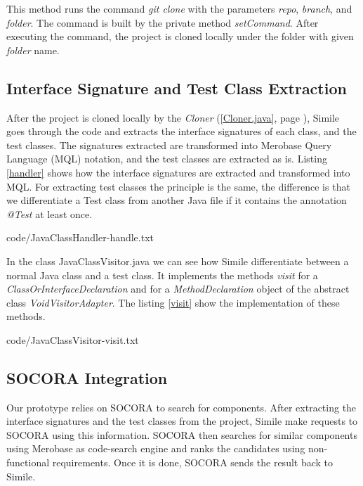 This method runs the command \emph{git clone} with the parameters \emph{repo}, \emph{branch}, and \emph{folder}. The command is built by the private method \emph{setCommand}. After executing the command, the project is cloned locally under the folder with given \emph{folder} name.

\subsection{Interface Signature and Test Class Extraction}
\label{simile:code-analysis}
After the project is cloned locally by the \emph{Cloner} (\ref{Cloner.java}, page \pageref{Cloner.java}), Simile goes through the code and extracts the interface signatures of each class, and the test classes. The signatures extracted are transformed into Merobase Query Language (MQL) notation, and the test classes are extracted as is. Listing \ref{handler} shows how the interface signatures are extracted and transformed into MQL. For extracting test classes the principle is the same, the difference is that we differentiate a Test class from another Java file if it contains the annotation \emph{@Test} at least once.


{code/JavaClassHandler-handle.txt}

In the class JavaClassVisitor.java we can see how Simile differentiate between a normal Java class and a test class. It implements the methods \emph{visit} for a \emph{ClassOrInterfaceDeclaration} and for a \emph{MethodDeclaration} object of the abstract class \emph{VoidVisitorAdapter}. The listing \ref{visit} show the implementation of these methods.


{code/JavaClassVisitor-visit.txt}

\subsection{SOCORA Integration}
\label{socora-integration}
Our prototype relies on SOCORA to search for components. After extracting the interface signatures and the test classes from the project, Simile make requests to SOCORA using this information. SOCORA then searches for similar components using Merobase as code-search engine and ranks the candidates using non-functional requirements. Once it is done, SOCORA sends the result back to Simile.

